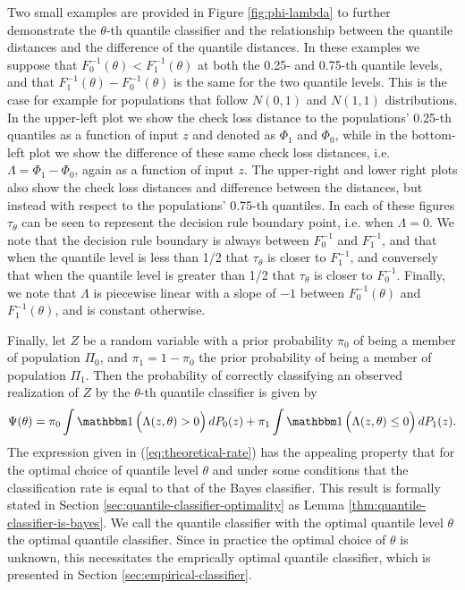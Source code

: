 Two small examples are provided in Figure \ref{fig:phi-lambda} to further
demonstrate the $\theta$-th quantile classifier and the relationship between the
quantile distances and the difference of the quantile distances.  In these
examples we suppose that $F_0^{-1}(\theta) < F_1^{-1}(\theta)$ at both the 0.25-
and 0.75-th quantile levels, and that $F_1^{-1}(\theta) - F_0^{-1}(\theta)$ is
the same for the two quantile levels.  This is the case for example for
populations that follow $N(0, 1)$ and $N(1, 1)$ distributions.  In the
upper-left plot we show the check loss distance to the populations' 0.25-th
quantiles as a function of input $z$ and denoted as $\Phi_1$ and $\Phi_0$, while
in the bottom-left plot we show the difference of these same check loss
distances, i.e.  $\Lambda = \Phi_1 - \Phi_0$, again as a function of input $z$.
The upper-right and lower right plots also show the check loss distances and
difference between the distances, but instead with respect to the populations'
0.75-th quantiles.  In each of these figures $\tau_{\theta}$ can be seen to
represent the decision rule boundary point, i.e. when $\Lambda = 0$.  We note
that the decision rule boundary is always between $F_{0}^{-1}$ and $F_{1}^{-1}$,
and that when the quantile level is less than 1/2 that $\tau_{\theta}$ is closer
to $F_{1}^{-1}$, and conversely that when the quantile level is greater than 1/2
that $\tau_{\theta}$ is closer to $F_{0}^{-1}$.  Finally, we note that $\Lambda$
is piecewise linear with a slope of $-1$ between $F_{0}^{-1}(\theta)$ and
$F_{1}^{-1}(\theta)$, and is constant otherwise.

Finally, let $Z$ be a random variable with a prior probability $\pi_0$ of being
a member of population $\Pi_0$, and $\pi_1 = 1 - \pi_0$ the prior probability of
being a member of population $\Pi_1$.  Then the probability of correctly
classifying an observed realization of $Z$ by the $\theta$-th quantile
classifier is given by
\begin{equation}
  \label{eq:theoretical-rate}
  \Psi(\theta) =
  \pi_0 \int \ind\Big( \Lambda(z, \theta) > 0 \Big)\, dP_0(z) +
  \pi_1 \int \ind\Big(\Lambda(z, \theta) \leq 0 \Big)\, dP_1(z).
\end{equation}
The expression given in (\ref{eq:theoretical-rate}) has the appealing property
that for the optimal choice of quantile level $\theta$ and under some conditions
that the classification rate is equal to that of the Bayes classifier.  This
result is formally stated in Section \ref{sec:quantile-classifier-optimality} as
Lemma \ref{thm:quantile-classifier-is-bayes}.  We call the quantile classifier
with the optimal quantile level $\theta$ the optimal quantile classifier.  Since
in practice the optimal choice of $\theta$ is unknown, this necessitates the
emprically optimal quantile classifier, which is presented in Section
\ref{sec:empirical-classifier}.


